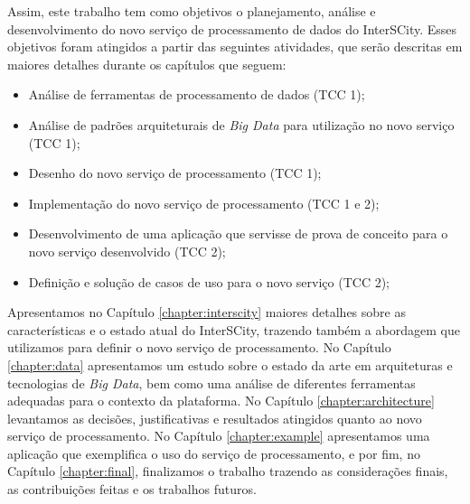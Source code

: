 Assim, este trabalho tem como objetivos o planejamento, análise e
desenvolvimento do novo serviço de processamento de dados do InterSCity. Esses
objetivos foram atingidos a partir das seguintes atividades, que serão descritas
em maiores detalhes durante os capítulos que seguem:
\begin{itemize}
  \item Análise de ferramentas de processamento de dados (TCC 1);
  \item Análise de padrões arquiteturais de \textit{Big Data} para utilização no
  novo serviço (TCC 1);
  \item Desenho do novo serviço de processamento (TCC 1);
  \item Implementação do novo serviço de processamento (TCC 1 e 2);
  \item Desenvolvimento de uma aplicação que servisse de prova de conceito para o
    novo serviço desenvolvido (TCC 2);
  \item Definição e solução de casos de uso para o novo serviço (TCC 2);
\end{itemize}

Apresentamos no Capítulo \ref{chapter:interscity} maiores detalhes sobre as
características e o estado atual do InterSCity, trazendo também a abordagem que
utilizamos para definir o novo serviço de processamento. No Capítulo
\ref{chapter:data} apresentamos um estudo sobre o estado da arte em arquiteturas
e tecnologias de \textit{Big Data}, bem como uma análise de diferentes
ferramentas adequadas para o contexto da plataforma. No Capítulo
\ref{chapter:architecture} levantamos as decisões, justificativas e resultados
atingidos quanto ao novo serviço de processamento. No Capítulo
\ref{chapter:example} apresentamos uma aplicação que exemplifica o uso do serviço
de processamento, e por fim, no Capítulo
\ref{chapter:final}, finalizamos o trabalho trazendo as considerações
finais, as contribuições feitas e os trabalhos futuros.
